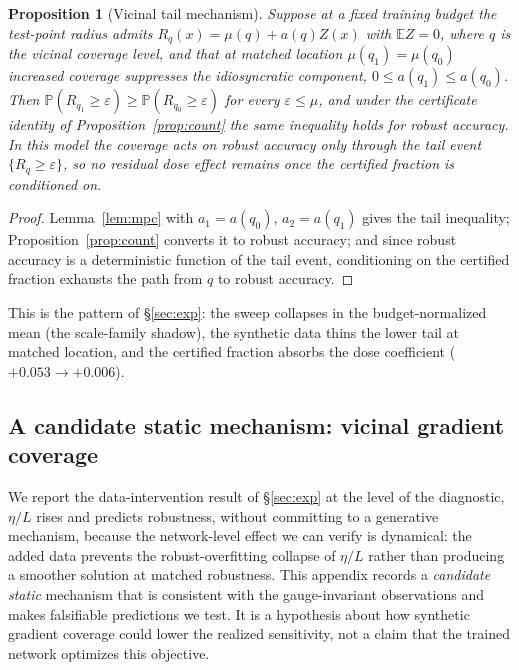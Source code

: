 \documentclass{article}
\newtheorem{proposition}{Proposition}
\theoremstyle{definition}
\begin{document}
\begin{proposition}[Vicinal tail mechanism]\label{prop:vic-tail}
Suppose at a fixed training budget the test-point radius admits $R_q(x)=\mu(q)+a(q)Z(x)$ with $\mathbb EZ=0$, where $q$ is the vicinal coverage level, and that at matched location $\mu(q_1)=\mu(q_0)$ increased coverage suppresses the idiosyncratic component, $0\le a(q_1)\le a(q_0)$. Then $\mathbb P(R_{q_1}\ge\varepsilon)\ge\mathbb P(R_{q_0}\ge\varepsilon)$ for every $\varepsilon\le\mu$, and under the certificate identity of Proposition~\ref{prop:count} the same inequality holds for robust accuracy. In this model the coverage acts on robust accuracy only through the tail event $\{R_q\ge\varepsilon\}$, so no residual dose effect remains once the certified fraction is conditioned on.
\end{proposition}
\begin{proof}
Lemma~\ref{lem:mpc} with $a_1=a(q_0)$, $a_2=a(q_1)$ gives the tail inequality; Proposition~\ref{prop:count} converts it to robust accuracy; and since robust accuracy is a deterministic function of the tail event, conditioning on the certified fraction exhausts the path from $q$ to robust accuracy.
\end{proof}
This is the pattern of \S\ref{sec:exp}: the sweep collapses in the budget-normalized mean (the scale-family shadow), the synthetic data thins the lower tail at matched location, and the certified fraction absorbs the dose coefficient ($+0.053\to+0.006$).

\subsection{A candidate static mechanism: vicinal gradient coverage}\label{app:vicinal}
We report the data-intervention result of \S\ref{sec:exp} at the level of the diagnostic, $\eta/L$ rises and predicts robustness, without committing to a generative mechanism, because the network-level effect we can verify is dynamical: the added data prevents the robust-overfitting collapse of $\eta/L$ rather than producing a smoother solution at matched robustness. This appendix records a \emph{candidate static} mechanism that is consistent with the gauge-invariant observations and makes falsifiable predictions we test. It is a hypothesis about how synthetic gradient coverage could lower the realized sensitivity, not a claim that the trained network optimizes this objective.
\end{document}
